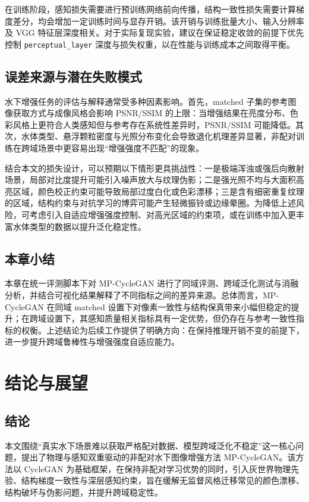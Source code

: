 \documentclass[a4paper,zihao=-4,linespread=1.25]{ctexart}
\begin{document}
在训练阶段，感知损失需要进行预训练网络前向传播，结构一致性损失需要计算梯度差分，均会增加一定训练时间与显存开销。该开销与训练批量大小、输入分辨率及 VGG 特征层深度相关。对于实际复现实验，建议在保证稳定收敛的前提下优先控制 \texttt{perceptual\_layer} 深度与损失权重，以在性能与训练成本之间取得平衡。

\subsection{误差来源与潜在失败模式}
水下增强任务的评估与解释通常受多种因素影响。首先，matched 子集的参考图像获取方式与成像风格会影响 PSNR/SSIM 的上限：当增强结果在亮度分布、色彩风格上更符合人类感知但与参考存在系统性差异时，PSNR/SSIM 可能降低。其次，水体类型、悬浮颗粒密度与光照分布变化会导致退化机理差异显著，非配对训练在跨域场景中更容易出现“增强强度不匹配”的现象。

结合本文的损失设计，可以预期以下情形更具挑战性：一是极端浑浊或强后向散射场景，局部对比度提升可能引入噪声放大与纹理伪影；二是强光照不均与大面积高亮区域，颜色校正约束可能导致局部过度白化或色彩漂移；三是含有细密重复纹理的区域，结构约束与对抗学习的博弈可能产生轻微振铃或边缘晕圈。为降低上述风险，可考虑引入自适应增强强度控制、对高光区域的约束项，或在训练中加入更丰富水体类型的数据以提升泛化稳定性。

\subsection{本章小结}
本章在统一评测脚本下对 MP-CycleGAN 进行了同域评测、跨域泛化测试与消融分析，并结合可视化结果解释了不同指标之间的差异来源。总体而言，MP-CycleGAN 在同域 matched 设置下对像素一致性与结构保真带来小幅但稳定的提升；在跨域设置下，其感知质量相关指标具有一定优势，但仍存在与参考一致性指标的权衡。上述结论为后续工作提供了明确方向：在保持推理开销不变的前提下，进一步提升跨域鲁棒性与增强强度自适应能力。

\section{结论与展望}
\subsection{结论}
本文围绕“真实水下场景难以获取严格配对数据、模型跨域泛化不稳定”这一核心问题，提出了物理与感知双重驱动的非配对水下图像增强方法 MP-CycleGAN。该方法以 CycleGAN 为基础框架，在保持非配对学习优势的同时，引入灰世界物理先验、结构梯度一致性与深层感知约束，旨在缓解无监督风格迁移常见的颜色漂移、结构破坏与伪影问题，并提升跨域稳定性。
\end{document}
